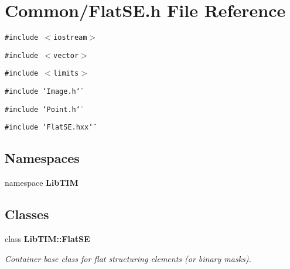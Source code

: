 \section{Common/Flat\-SE.h File Reference}
\label{FlatSE_8h}
{\tt \#include $<$iostream$>$}\par
{\tt \#include $<$vector$>$}\par
{\tt \#include $<$limits$>$}\par
{\tt \#include \char`\"{}Image.h\char`\"{}}\par
{\tt \#include \char`\"{}Point.h\char`\"{}}\par
{\tt \#include \char`\"{}Flat\-SE.hxx\char`\"{}}\par
\subsection*{Namespaces}
\begin{CompactItemize}
\item 
namespace {\bf Lib\-TIM}
\end{CompactItemize}
\subsection*{Classes}
\begin{CompactItemize}
\item 
class {\bf Lib\-TIM::Flat\-SE}
\begin{CompactList}\small\item\em Container base class for flat structuring elements (or binary masks). \item\end{CompactList}\end{CompactItemize}
